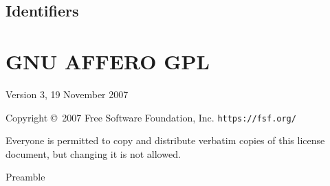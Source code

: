 \documentclass{article}%
\begin{document}
\nowebchunks

\subsection{Identifiers}

\nowebindex

\clearpage
\section{GNU AFFERO GPL}

\begin{center}
{\parindent 0in

Version 3, 19 November 2007

Copyright \copyright\  2007 Free Software Foundation, Inc. \texttt{https://fsf.org/}

\bigskip
Everyone is permitted to copy and distribute verbatim copies of this
license document, but changing it is not allowed.}

\end{center}

\begin{center}
{\Large Preamble}
\end{center}
\end{document}
